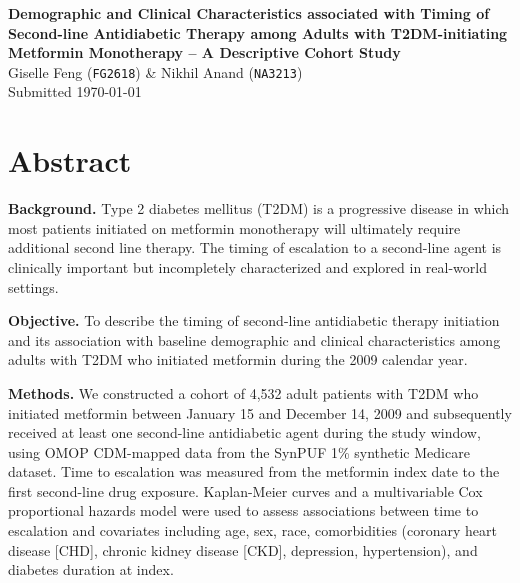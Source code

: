 \documentclass[twoside,11pt]{article}
\begin{document}
\raggedbottom

{\Large \textbf{Demographic and Clinical Characteristics associated with Timing of Second-line Antidiabetic Therapy among Adults with T2DM-initiating Metformin Monotherapy -- A Descriptive Cohort Study}}\\[0.75em]
{\large Giselle Feng (\texttt{FG2618}) \& Nikhil Anand (\texttt{NA3213})}\\[0.5em]
{\small Submitted \today}\\[0.5em]



\section*{Abstract}

\textbf{Background.} Type 2 diabetes mellitus (T2DM) is a progressive disease in which most patients initiated on metformin monotherapy will ultimately require additional second line therapy. The timing of escalation to a second-line agent is clinically important but incompletely characterized and explored in real-world settings.

\textbf{Objective.} To describe the timing of second-line antidiabetic therapy initiation and its association with baseline demographic and clinical characteristics among adults with T2DM who initiated metformin during the 2009 calendar year.

\textbf{Methods.} We constructed a cohort of 4,532 adult patients with T2DM who initiated metformin between January 15 and December 14, 2009 and subsequently received at least one second-line antidiabetic agent during the study window, using OMOP CDM-mapped data from the SynPUF 1\% synthetic Medicare dataset. Time to escalation was measured from the metformin index date to the first second-line drug exposure. Kaplan-Meier curves and a multivariable Cox proportional hazards model were used to assess associations between time to escalation and covariates including age, sex, race, comorbidities (coronary heart disease [CHD], chronic kidney disease [CKD], depression, hypertension), and diabetes duration at index.
\end{document}

